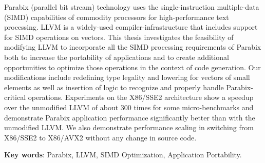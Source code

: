 
%
%


Parabix (parallel bit stream) technology uses the single-instruction multiple-data (SIMD) capabilities of commodity processors for high-performance text processing. LLVM is a widely-used compiler-infrastructure that includes support for SIMD operations on vectors. This thesis investigates the feasibility of modifying LLVM to incorporate all the SIMD processing requirements of Parabix both to increase the portability of applications and to create additional opportunities to optimize those operations in the context of code generation. Our modifications include redefining type legality and lowering for vectors of small elements as well as insertion of logic to recognize and properly handle Parabix-critical operations. Experiments on the X86/SSE2 architecture show a speedup over the unmodified LLVM of about 300 times for some micro-benchmarks and demonstrate Parabix application performance significantly better than with the unmodified LLVM. We also demonstrate performance scaling in switching from X86/SSE2 to X86/AVX2 without any change in source code.

\textbf{Key words}: Parabix, LLVM, SIMD Optimization, Application Portability.
